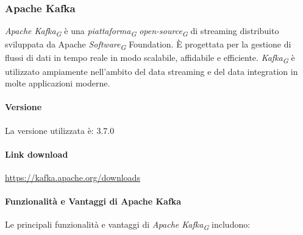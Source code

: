 \subsubsection{Apache Kafka}

\textit{Apache Kafka}\textsubscript{\textit{G}} è una \textit{piattaforma}\textsubscript{\textit{G}} \textit{open-source}\textsubscript{\textit{G}} di streaming distribuito sviluppata da Apache \textit{Software}\textsubscript{\textit{G}} Foundation. È progettata per la gestione di flussi di dati in tempo reale in modo scalabile, affidabile e efficiente. \textit{Kafka}\textsubscript{\textit{G}} è utilizzato ampiamente nell'ambito del data streaming e del data integration in molte applicazioni moderne.
\paragraph{Versione}
La versione utilizzata è: 3.7.0
\paragraph{Link download}
\href{https://kafka.apache.org/downloads}{https://kafka.apache.org/downloads}

\paragraph{Funzionalità e Vantaggi di Apache Kafka}
Le principali funzionalità e vantaggi di \textit{Apache Kafka}\textsubscript{\textit{G}} includono:

